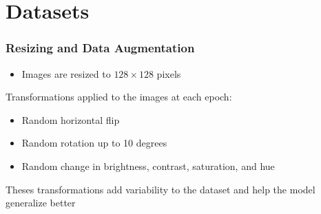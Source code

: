 \documentclass[../presentation.tex]{subfiles} %
\begin{document}
\section{Datasets}

\begin{frame}

    \frametitle{Resizing and Data Augmentation}

    \begin{cbox}[cyan]
        \begin{itemize}
            \item Images are resized to $128 \times 128$ pixels
        \end{itemize}
    \end{cbox}

    \vspace{0.2cm}

    \begin{cbox}
        Transformations applied to the images at each epoch:
        \begin{itemize}
            \item Random horizontal flip
            \item Random rotation up to 10 degrees
            \item Random change in brightness, contrast, saturation, and hue
        \end{itemize}

        \vspace{0.2cm}

        Theses transformations add variability to the dataset and help the model generalize better
    \end{cbox}

\end{frame}
\end{document}
